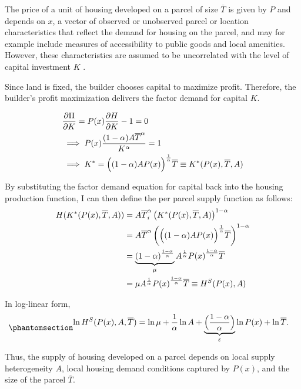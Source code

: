 \documentclass[
  12pt,
]{article}
\begin{document}
The price of a unit of housing developed on a parcel of size
\(\overline{T}\) is given by \(P\) and depends on \(x\), a vector of
observed or unobserved parcel or location characteristics that reflect
the demand for housing on the parcel, and may for example include
measures of accessibility to public goods and local amenities. However,
these characteristics are assumed to be uncorrelated with the level of
capital investment \(K\) \citep{combes_etal_2021}.

Since land is fixed, the builder chooses capital to maximize profit.
Therefore, the builder's profit maximization delivers the factor demand
for capital \(K\).

\[
\begin{aligned}
&\frac{\partial \Pi}{\partial K} = P(x) \frac{\partial H}{\partial K} - 1 = 0\\
&\implies P(x) \frac{(1-\alpha) A \overline{T}^\alpha}{K^\alpha} = 1 \\
&\implies K^* = \Bigl((1-\alpha)AP(x)\Bigr)^{\frac{1}{\alpha}}\overline{T}\equiv K^*(P(x), \overline{T}, A)
\end{aligned}
\]

By substituting the factor demand equation for capital back into the
housing production function, I can then define the per parcel supply
function as follows: \[
\begin{aligned}
H(K^*(P(x), \overline{T}, A)) &= A \overline{T}^\alpha_i \left(K^*(P(x), \overline{T}, A)\right)^{1-\alpha}\\
&= A \overline{T}^\alpha \left(\Bigl((1-\alpha)AP(x)\Bigr)^{\frac{1}{\alpha}}\overline{T}\right)^{1-\alpha}\\
&=\underbrace{(1-\alpha)^{\frac{1-\alpha}{\alpha}}}_{\mu}A^{\frac{1}{\alpha}}{P(x)}^{\frac{1-\alpha}{\alpha}}\overline{T}\\
&=\mu A^{\frac{1}{\alpha}}{P(x)}^{\frac{1-\alpha}{\alpha}}\overline{T} \equiv H^S(P(x), A)
\end{aligned}
\]

In log-linear form,
\begin{equation}\phantomsection\label{eq-hs-appendix}{
\begin{aligned}
\ln H^S(P(x), A, \overline{T}) &= \ln \mu + \frac{1}{\alpha}\ln A + \underbrace{\Bigl(\frac{1-\alpha}{\alpha}\Bigr)}_{\varepsilon}\ln P(x) + \ln \overline{T}.
\end{aligned}
}\end{equation}

Thus, the supply of housing developed on a parcel depends on local
supply heterogeneity \(A\), local housing demand conditions captured by
\(P(x)\), and the size of the parcel \(\overline{T}\).
\end{document}
